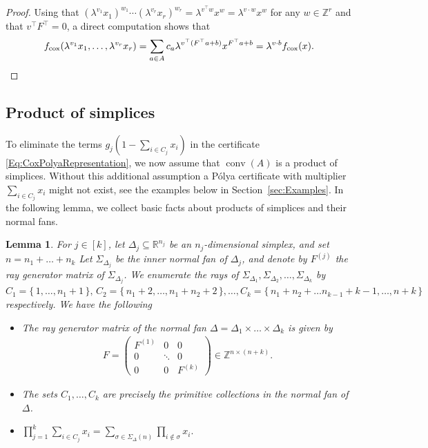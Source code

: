 \documentclass[a4paper,11pt]{amsart}
\newtheorem{lemma}[theorem]{Lemma}
\theoremstyle{definition}
\DeclareMathOperator{\conv}{conv}
\newcommand{\RR}{\mathbb{R}}
\newcommand{\cox}{\mathrm{cox}}
\begin{document}
\begin{proof}
    Using that $(\lambda^{v_1}x_1)^{w_1}\cdots (\lambda^{v_r}x_r)^{w_r}= \lambda^{v^\top  w}x^w =  \lambda^{v \cdot w}x^w$ for any $w\in \mathbb{Z}^r$ and that $v^\top F^\top=0$, a direct computation shows that
    \[
    f_\cox(\lambda^{v_1} x_1, \dots, \lambda^{v_r} x_r) = \sum_{a\in A}c_a \lambda^{v^\top(F^\top a+b)} x^{F^\top a+b} = \lambda^{v\cdot b}f_\cox(x). \hfill\qedhere
    \]
\end{proof}

\subsection{Product of simplices}
\label{sec:ProdSimplex}
To eliminate the terms $g_j\left(1-\sum_{i\in C_j}x_i\right)$ in the certificate \eqref{Eq:CoxPolyaRepresentation}, we now assume that $\conv(A)$ is a product of simplices. Without this additional assumption a Pólya certificate with multiplier $\sum_{i\in C_j}x_i$ might not exist, see the examples below in Section~\ref{sec:Examples}. In the following lemma, we collect basic facts about products of simplices and their normal fans.

\begin{lemma}
\label{lem:simplicesKernel}
\label{Lemma:ProductSimplices}
For $j\in [k]$, let $\Delta_j \subseteq \RR^{n_j}$ be an $n_j$-dimensional simplex, and set $n = n_1 + \dots + n_k$
Let $\Sigma_{\Delta_j}$ be the inner normal fan of $\Delta_j$, and denote by $F^{(j)}$ the ray generator matrix of $\Sigma_{\Delta_j}$.
We enumerate the rays of $\Sigma_{\Delta_1}, \Sigma_{\Delta_2}, \dots, \Sigma_{\Delta_k}$ by $C_1 = \{\,1,\dots,n_1+1\,\}, \, C_2 = \{\, n_1 +2,\dots, n_1+n_2+2 \,\}, \dots ,C_k = \{\, n_1 + n_2 + \dots n_{k-1} + k-1,\dots, n + k \,\}$ respectively. 
We have the following
\begin{itemize}
    \item[(i)]
The ray generator matrix of the normal fan $\Delta = \Delta_1 \times \dots \times \Delta_k$ is given by
 \begin{align*}
F =\begin{pmatrix}
F^{(1)} & 0 & 0 \\
0 & \ddots & 0 \\
0 & 0 & F^{(k)} 
\end{pmatrix} \in \mathbb{Z}^{n  \times (n  + k)}.
\end{align*}
\item[(ii)] The sets $C_1,\ldots,C_k$ are precisely the primitive collections in the normal fan of $\Delta$.
\item[(iii)]
  $  \prod_{j=1}^k\sum_{i\in C_j}x_i=\sum_{\sigma \in \Sigma_\Delta(n)} \prod_{i \notin \sigma} x_i.$
\end{itemize}
\end{lemma}
\end{document}
